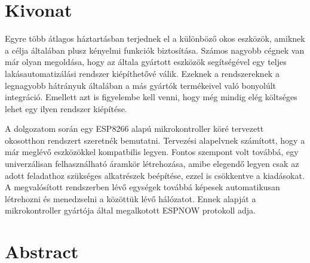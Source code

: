 \setcounter{page}{1}

\selecthungarian

\chapter*{Kivonat}


Egyre több átlagos háztartásban terjednek el a különböző okos eszközök, amiknek a célja általában plusz kényelmi funkciók biztosítása. Számos nagyobb cégnek van már olyan megoldása, hogy az általa gyártott eszközök segítségével egy teljes lakásautomatizálási rendszer kiépíthetővé válik. Ezeknek a rendszereknek a legnagyobb hátrányuk általában a más gyártók termékeivel való bonyolúlt integráció. Emellett azt is figyelembe kell venni, hogy még mindig elég költséges lehet egy ilyen rendszer kiépítése.

A dolgozatom során egy ESP8266 alapú mikrokontroller köré tervezett okosotthon rendszert szeretnék bemutatni. Tervezési alapelvnek számított, hogy a már meglévő eszközökkel kompatbilis legyen. Fontos szempont volt továbbá, egy univerzálisan felhasználható áramkör létrehozása, amibe elegendő legyen csak az adott feladathoz szükséges alkatrészek beépítése, ezzel is csökkentve a kiadásokat.
A megvalósított rendszerben lévő egységek továbbá képesek automatikusan létrehozni és menedzselni a közöttük lévő hálózatot. Ennek alapját a mikrokontroller gyártója által megalkotott ESPNOW protokoll adja.

\vfill
\selectenglish


\chapter*{Abstract}

